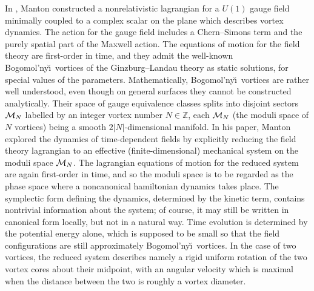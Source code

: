 \documentclass[a4paper,11pt]{article}
\begin{document}
In \cite{Mfovd}, Manton constructed a nonrelativistic lagrangian
for a $U(1)$ gauge field minimally coupled to a complex scalar on the
plane which 
describes vortex dynamics. The action for the gauge field 
includes a Chern--Simons term and the purely spatial part of the
Maxwell action. The equations of motion for the field theory 
are first-order in time, and 
they admit the well-known Bogomol'ny\u \i\ vortices \cite{JT} of the 
Ginzburg--Landau theory as static solutions, for special values of the
parameters. Mathematically, Bogomol'ny\u\i\ vortices are rather well 
understood, even though on general surfaces they cannot be constructed
analytically. 
Their space of gauge equivalence classes splits into disjoint 
sectors ${\cal M}_{N}$
labelled by an integer vortex number $N\in \mathbb{Z}$, each ${\cal M}_{N}$
(the moduli space of $N$ vortices) being a smooth $2|N|$-dimensional manifold.
In his paper, Manton explored the dynamics of time-dependent fields by 
explicitly reducing the field theory lagrangian to an effective 
(finite-dimensional) mechanical system on the moduli space ${\cal M}_{N}$.
The lagrangian equations of motion for the reduced system
are again first-order in time, 
and so the moduli space is to be regarded as the phase space where a 
noncanonical hamiltonian dynamics takes
place. The symplectic form defining the dynamics, determined by the
kinetic term, contains nontrivial 
information about the system; of course, it may still be written in 
canonical form locally, but not in a natural way.
Time evolution is determined by the potential energy alone, which is
supposed to be small so that the field configurations are still
approximately Bogomol'ny\u\i\ vortices.
In the case of two vortices, the reduced system describes namely a
rigid uniform 
rotation of the two vortex cores about their midpoint, with an angular 
velocity which is maximal when the distance between the two is roughly
a vortex diameter.
\end{document}
